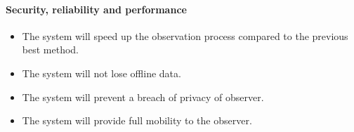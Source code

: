     \paragraph{Security, reliability and performance}
	\begin{itemize}
        
        \item The system will speed up the observation process compared to the previous best method.
        \item The system will not lose offline data.
        \item The system will prevent a breach of privacy of observer.
        \item The system will provide full mobility to the observer.

	\end{itemize}
